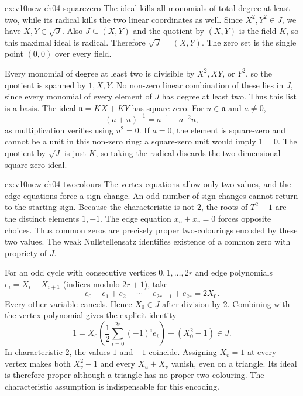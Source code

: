 \begin{solution}{ex:v10new-ch04-squarezero}
\idea The ideal kills all monomials of total degree at least two, while its radical kills the two linear coordinates as well.
\writeup Since $X^2,Y^2\in J$, we have $X,Y\in\sqrt J$. Also $J\subseteq(X,Y)$ and the quotient by $(X,Y)$ is the field $K$, so this maximal ideal is radical. Therefore $\sqrt J=(X,Y)$. The zero set is the single point $(0,0)$ over every field.

Every monomial of degree at least two is divisible by $X^2,XY$, or $Y^2$, so the quotient is spanned by $1,\bar X,\bar Y$. No non-zero linear combination of these lies in $J$, since every monomial of every element of $J$ has degree at least two. Thus this list is a basis. The ideal $\mathfrak n=K\bar X+K\bar Y$ has square zero. For $u\in\mathfrak n$ and $a\ne0$,
\[
(a+u)^{-1}=a^{-1}-a^{-2}u,
\]
as multiplication verifies using $u^2=0$. If $a=0$, the element is square-zero and cannot be a unit in this non-zero ring: a square-zero unit would imply $1=0$. The quotient by $\sqrt J$ is just $K$, so taking the radical discards the two-dimensional square-zero ideal.
\end{solution}

\begin{solution}{ex:v10new-ch04-twocolours}
\idea The vertex equations allow only two values, and the edge equations force a sign change. An odd number of sign changes cannot return to the starting sign.
\writeup Because the characteristic is not $2$, the roots of $T^2-1$ are the distinct elements $1,-1$. The edge equation $x_u+x_v=0$ forces opposite choices. Thus common zeros are precisely proper two-colourings encoded by these two values. The weak Nullstellensatz identifies existence of a common zero with propriety of $J$.

For an odd cycle with consecutive vertices $0,1,\ldots,2r$ and edge polynomials $e_i=X_i+X_{i+1}$ (indices modulo $2r+1$), take
\[
e_0-e_1+e_2-\cdots-e_{2r-1}+e_{2r}=2X_0.
\]
Every other variable cancels. Hence $X_0\in J$ after division by $2$. Combining with the vertex polynomial gives the explicit identity
\[
1=X_0\left(\frac12\sum_{i=0}^{2r}(-1)^ie_i\right)-(X_0^2-1)\in J.
\]
In characteristic $2$, the values $1$ and $-1$ coincide. Assigning $X_v=1$ at every vertex makes both $X_v^2-1$ and every $X_u+X_v$ vanish, even on a triangle. Its ideal is therefore proper although a triangle has no proper two-colouring. The characteristic assumption is indispensable for this encoding.
\end{solution}

